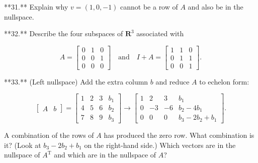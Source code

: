 **31.** Explain why \(v=(1,0,-1)\) cannot be a row of \(A\) and also be in the nullspace.

**32.** Describe the four subspaces of \(\mathbf{R}^{3}\) associated with

\[A=\begin{bmatrix}0&1&0\\ 0&0&1\\ 0&0&0\end{bmatrix}\quad\text{and}\quad I+A=\begin{bmatrix}1&1&0\\ 0&1&1\\ 0&0&1\end{bmatrix}.\]

**33.** (Left nullspace) Add the extra column \(b\) and reduce \(A\) to echelon form:

\[\begin{bmatrix}A&b\end{bmatrix}=\begin{bmatrix}1&2&3&b_{1}\\ 4&5&6&b_{2}\\ 7&8&9&b_{3}\end{bmatrix}\to\begin{bmatrix}1&2&3&b_{1}\\ 0&-3&-6&b_{2}-4b_{1}\\ 0&0&0&b_{3}-2b_{2}+b_{1}\end{bmatrix}.\]

A combination of the rows of \(A\) has produced the zero row. What combination is it? (Look at \(b_{3}-2b_{2}+b_{1}\) on the right-hand side.) Which vectors are in the nullspace of \(A^{\text{T}}\) and which are in the nullspace of \(A\)?